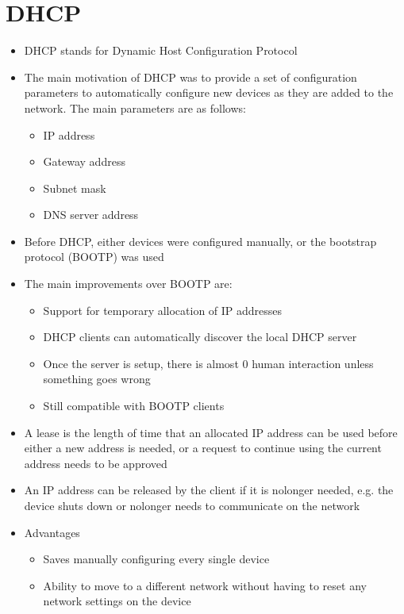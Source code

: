 
\section*{DHCP}

\begin{itemize}
  \item DHCP stands for Dynamic Host Configuration Protocol
  \item The main motivation of DHCP was to provide a set of configuration parameters to automatically configure new devices as they are added to the network. The main parameters are as follows:
  \begin{itemize}
    \item IP address
    \item Gateway address
    \item Subnet mask
    \item DNS server address
  \end{itemize}
  \item Before DHCP, either devices were configured manually, or the bootstrap protocol (BOOTP) was used
  \item The main improvements over BOOTP are:
  \begin{itemize}
    \item Support for temporary allocation of IP addresses
    \item DHCP clients can automatically discover the local DHCP server
    \item Once the server is setup, there is almost 0 human interaction unless something goes wrong
    \item Still compatible with BOOTP clients
  \end{itemize}
  \item A lease is the length of time that an allocated IP address can be used before either a new address is needed, or a request to continue using the current address needs to be approved
  \item An IP address can be released by the client if it is nolonger needed, e.g. the device shuts down or nolonger needs to communicate on the network
  \item Advantages
  \begin{itemize}
    \item Saves manually configuring every single device
    \item Ability to move to a different network without having to reset any network settings on the device

\end{itemize}
\end{itemize}
